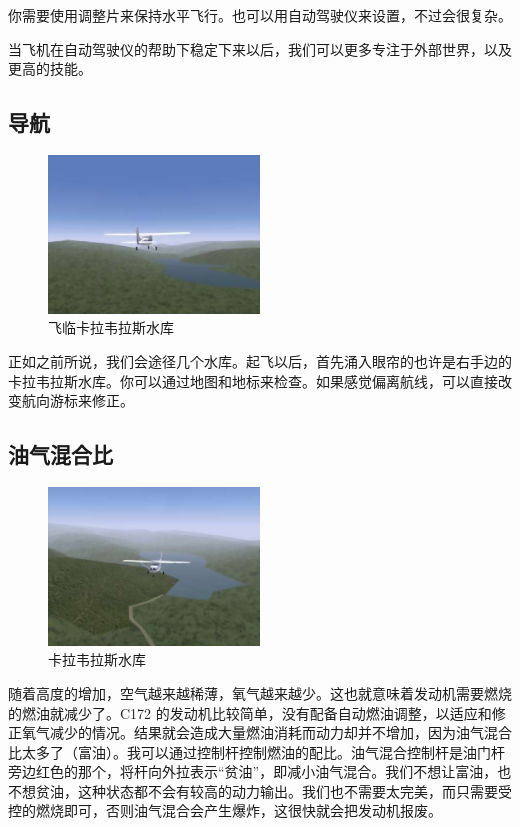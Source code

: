 你需要使用调整片来保持水平飞行。也可以用自动驾驶仪来设置，不过会很复杂。

当飞机在自动驾驶仪的帮助下稳定下来以后，我们可以更多专注于外部世界，以及更高的技能。

\subsection{导航}

\begin{figure}[!htp]
\centering
\includegraphics[width=0.5\textwidth]{calaveras1}
\caption{飞临卡拉韦拉斯水库}
\end{figure}

正如之前所说，我们会途径几个水库。起飞以后，首先涌入眼帘的也许是右手边的卡拉韦拉斯水库。你可以通过地图和地标来检查。如果感觉偏离航线，可以直接改变航向游标来修正。

\subsection{油气混合比}

\begin{figure}[!htp]
\centering
\includegraphics[width=0.5\textwidth]{calaveras2}
\caption{卡拉韦拉斯水库}
\end{figure}

随着高度的增加，空气越来越稀薄，氧气越来越少。这也就意味着发动机需要燃烧的燃油就减少了。C172 的发动机比较简单，没有配备自动燃油调整，以适应和修正氧气减少的情况。结果就会造成大量燃油消耗而动力却并不增加，因为油气混合比太多了（富油）。我可以通过控制杆控制燃油的配比。油气混合控制杆是油门杆旁边红色的那个，将杆向外拉表示“贫油”，即减小油气混合。我们不想让富油，也不想贫油，这种状态都不会有较高的动力输出。我们也不需要太完美，而只需要受控的燃烧即可，否则油气混合会产生爆炸，这很快就会把发动机报废。

